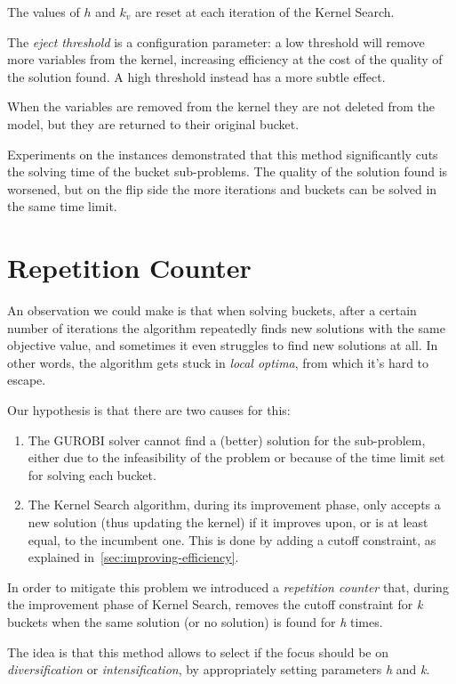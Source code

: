 The values of \(h\) and \(k_{v}\) are reset at each iteration of the Kernel Search.

The \textit{eject threshold} is a configuration parameter:
a low threshold will remove more variables from the kernel, increasing efficiency at the cost of the quality of the
solution found.
A high threshold instead has a more subtle effect.

When the variables are removed from the kernel they are not deleted from the model,
but they are returned to their original bucket.

Experiments on the instances demonstrated that this method significantly cuts
the solving time of the bucket sub-problems.
The quality of the solution found is worsened, but on the flip side
the more iterations and buckets can be solved in the same time limit.


\section{Repetition Counter}
An observation we could make is that when solving buckets,
after a certain number of iterations the algorithm
repeatedly finds new solutions with the same objective value,
and sometimes it even struggles to find new solutions at all.
In other words, the algorithm gets stuck in \textit{local optima},
from which it's hard to escape.

Our hypothesis is that there are two causes for this:
\begin{enumerate}
    \item The GUROBI solver cannot find a (better) solution for the sub-problem,
    either due to the infeasibility of the problem or because of
    the time limit set for solving each bucket.
    \item The Kernel Search algorithm, during its improvement phase,
    only accepts a new solution (thus updating the kernel)
    if it improves upon, or is at least equal, to the incumbent one.
    This is done by adding a cutoff constraint, as explained in~\ref{sec:improving-efficiency}.
\end{enumerate}

In order to mitigate this problem we introduced a \textit{repetition counter}
that, during the improvement phase of Kernel Search,
removes the cutoff constraint for \textit{k} buckets
when the same solution (or no solution) is found for \textit{h} times.

The idea is that this method allows to select if the focus should be on
\textit{diversification} or \textit{intensification},
by appropriately setting parameters \textit{h} and \textit{k}.

